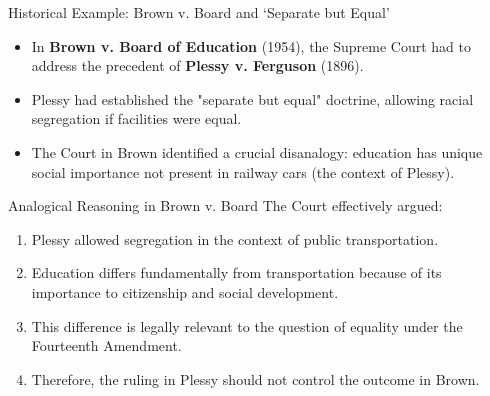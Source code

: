 \documentclass{beamer}
\begin{document}
\begin{frame}{Historical Example: Brown v. Board and `Separate but Equal'}
	\begin{itemize}
		\item In \textbf{Brown v. Board of Education} (1954), the Supreme Court had to address the precedent of \textbf{Plessy v. Ferguson} (1896).
		\item Plessy had established the "separate but equal" doctrine, allowing racial segregation if facilities were equal.
		\item The Court in Brown identified a crucial disanalogy: education has unique social importance not present in railway cars (the context of Plessy).
	\end{itemize}
	
	\begin{block}{Analogical Reasoning in Brown v. Board}
		\scriptsize
		The Court effectively argued:
		\begin{enumerate}
			\item Plessy allowed segregation in the context of public transportation.
			\item Education differs fundamentally from transportation because of its importance to citizenship and social development.
			\item This difference is legally relevant to the question of equality under the Fourteenth Amendment.
			\item Therefore, the ruling in Plessy should not control the outcome in Brown.
		\end{enumerate}
	\end{block}
\end{frame}
\end{document}

